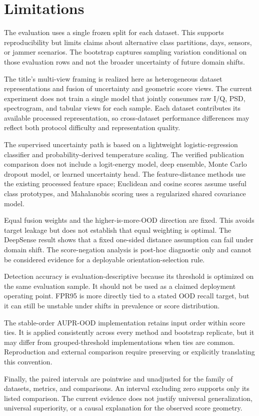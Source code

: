 \section{Limitations}
\label{sec:limitations}

The evaluation uses a single frozen split for each dataset. This supports reproducibility but limits claims about alternative class partitions, days, sensors, or jammer scenarios. The bootstrap captures sampling variation conditional on those evaluation rows and not the broader uncertainty of future domain shifts.

The title's multi-view framing is realized here as heterogeneous dataset representations and fusion of uncertainty and geometric score views. The current experiment does not train a single model that jointly consumes raw I/Q, PSD, spectrogram, and tabular views for each sample. Each dataset contributes its available processed representation, so cross-dataset performance differences may reflect both protocol difficulty and representation quality.

The supervised uncertainty path is based on a lightweight logistic-regression classifier and probability-derived temperature scaling. The verified publication comparison does not include a logit-energy model, deep ensemble, Monte Carlo dropout model, or learned uncertainty head. The feature-distance methods use the existing processed feature space; Euclidean and cosine scores assume useful class prototypes, and Mahalanobis scoring uses a regularized shared covariance model.

Equal fusion weights and the higher-is-more-OOD direction are fixed. This avoids target leakage but does not establish that equal weighting is optimal. The DeepSense result shows that a fixed one-sided distance assumption can fail under domain shift. The score-negation analysis is post-hoc diagnostic only and cannot be considered evidence for a deployable orientation-selection rule.

Detection accuracy is evaluation-descriptive because its threshold is optimized on the same evaluation sample. It should not be used as a claimed deployment operating point. FPR95 is more directly tied to a stated OOD recall target, but it can still be unstable under shifts in prevalence or score distribution.

The stable-order AUPR-OOD implementation retains input order within score ties. It is applied consistently across every method and bootstrap replicate, but it may differ from grouped-threshold implementations when ties are common. Reproduction and external comparison require preserving or explicitly translating this convention.

Finally, the paired intervals are pointwise and unadjusted for the family of datasets, metrics, and comparisons. An interval excluding zero supports only its listed comparison. The current evidence does not justify universal generalization, universal superiority, or a causal explanation for the observed score geometry.
